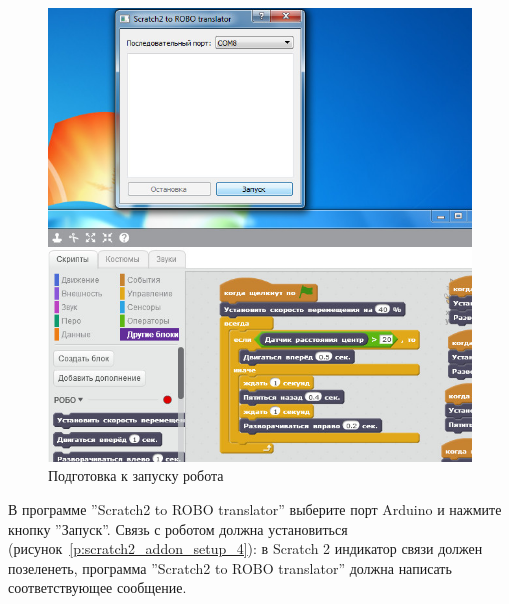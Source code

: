 \begin{figure}[H]\center
  \captionsetup{singlelinecheck=true} %
  \includegraphics*[scale=0.7]{about/images/scratch2_addon_setup_3}
  \caption{Подготовка к запуску робота} \label{p:scratch2_addon_setup_3}
\end{figure}

В программе ''Scratch2 to ROBO translator'' выберите порт Arduino и нажмите кнопку ''Запуск''. Связь с роботом должна установиться (рисунок~\ref{p:scratch2_addon_setup_4}): в Scratch 2 индикатор связи должен позеленеть, программа ''Scratch2 to ROBO translator'' должна написать соответствующее сообщение.


